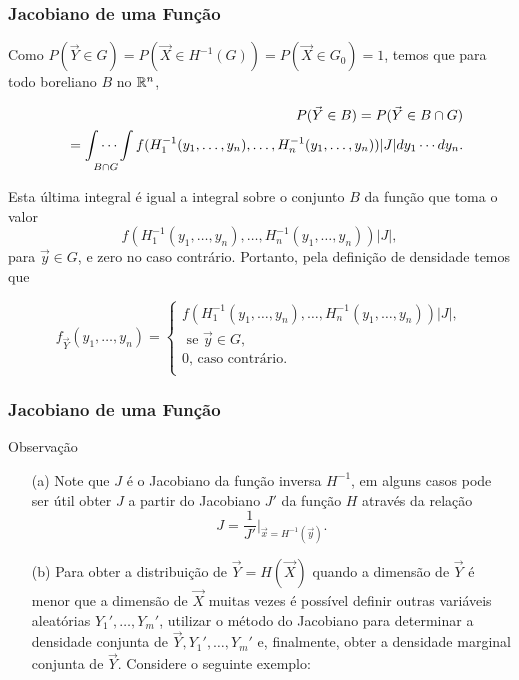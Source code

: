 \begin{frame}
\frametitle{\textbf{Jacobiano de uma Função}}
\baselineskip=13pt
\begin{block}{}


Como $P(\vec{Y}\in G)=P(\vec{X}\in H^{-1}(G))=P(\vec{X}\in G_0)=1$, temos que para todo boreliano $B$ no $\mathbb{R}^n$,

\begin{eqnarray}
& & P(\vec{Y}\in B)=P(\vec{Y}\in B\cap G)\nonumber \\
& & =\idotsint\limits_{B\cap G} f(H_1^{-1}(y_1,\ldots,y_n),\ldots,H_n^{-1}(y_1,\ldots,y_n))|J|dy_1\cdots dy_n.\nonumber
\end{eqnarray}

Esta última integral é igual a integral sobre o conjunto $B$ da função que toma o valor $$f(H_1^{-1}(y_1,\ldots,y_n),\ldots,H_n^{-1}(y_1,\ldots,y_n))|J|,$$ para $\vec{y}\in G$, e zero no caso contrário. Portanto, pela definição de densidade temos que

\[
f_{\vec{Y}}(y_1,\ldots,y_n)=\left\{
\begin{array}{l}
f(H_1^{-1}(y_1,\ldots,y_n),\ldots,H_n^{-1}(y_1,\ldots,y_n))|J|, \\
\mbox{\ \ \ \ se $\vec{y}\in G$,} \\
0 \mbox{, caso contrário.}\\
\end{array}
\right.
\]


\end{block}
\end{frame}

\begin{frame}
\frametitle{\textbf{Jacobiano de uma Função}}
\baselineskip=13pt
\begin{block}{Observação}


\begin{enumerate}
\item[(a)] Note que $J$ é o Jacobiano da função inversa $H^{-1}$, em alguns casos pode ser útil obter $J$ a partir do Jacobiano $J'$ da função $H$ através da relação $$J=\frac{1}{J'}|_{\vec{x}=H^{-1}(\vec{y})}.$$
\item[(b)] Para obter a distribuição de $\vec{Y}=H(\vec{X})$ quando a dimensão de $\vec{Y}$ é menor que a dimensão de $\vec{X}$ muitas vezes é possível definir outras variáveis aleatórias $Y_1',\ldots,Y_m'$, utilizar o método do Jacobiano para determinar a densidade conjunta de $\vec{Y},Y_1',\ldots,Y_m'$ e, finalmente, obter a densidade marginal conjunta de $\vec{Y}$. Considere o seguinte exemplo:
\end{enumerate}
\end{block}
\end{frame}

